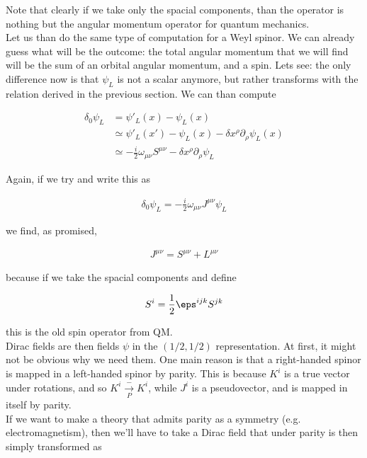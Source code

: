 \documentclass{report}
\begin{document}
Note that clearly if we take only the spacial components, than the operator is nothing but the angular momentum operator for quantum mechanics. \\


Let us than do the same type of computation for a Weyl spinor. We can already guess what will be the outcome: the total angular momentum that we will find will be the sum of an orbital angular momentum, and a spin. Lets see: the only difference now is that \(\psi_L\) is not a scalar anymore, but rather transforms with the relation derived in the previous section. We can than compute

\begin{align}
    \delta_0 \psi_L &= \psi'_L (x) - \psi_L (x) \\
    &\simeq \psi'_L (x') - \psi_L (x) -\delta x^\rho \partial_\rho \psi_L (x) \\ 
    &\simeq -\frac{i}{2}\omega_{\mu\nu} S^{\mu\nu} - \delta x^\rho \partial_\rho \psi_L
\end{align}

Again, if we try and write this as 

\begin{align}
    \delta_0 \psi_L = -\frac{i}{2}\omega_{\mu\nu}J^{\mu\nu}\psi_L
\end{align}

we find, as promised, 

\begin{align}
    J^{\mu\nu} = S^{\mu\nu} + L^{\mu\nu}
\end{align}

because if we take the spacial components and define 

\begin{align}
    S^i = \frac{1}{2}\eps^{ijk}S^{jk}
\end{align}

this is the old spin operator from QM. \\

Dirac fields are then fields \(\psi\) in the \((1/2, 1/2)\) representation. At first, it might not be obvious why we need them. One main reason is that a right-handed spinor is mapped in a left-handed spinor by parity. This is because \(K^i\) is a true vector under rotations, and so \(K^i \xrightarrow[P] -K^i\), while \(J^i\) is a pseudovector, and is mapped in itself by parity. \\

If we want to make a theory that admits parity as a symmetry (e.g. electromagnetism), then we'll have to take a Dirac field that under parity is then simply transformed as 
\end{document}
